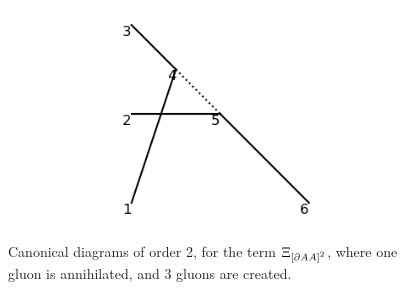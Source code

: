 \documentclass[11pt,a4paper,twoside,pdf]{article}
\numberwithin{equation}{section}
\begin{document}
\begin{figure}[h!]
    \begin{subfigure}[t]{0.33\textwidth}
        \centering
        \includegraphics[width=\textwidth]{plots/canonical/order2/3.png}
        \caption{ }
    \end{subfigure}
    \caption{Canonical diagrams of order 2, for the term $\Xi_{\left[ \partial AA \right]^2}$, 
    where one gluon is annihilated, and 3 gluons are created.}
    \label{fig:cannonical2_1to3}
\end{figure}
\end{document}
